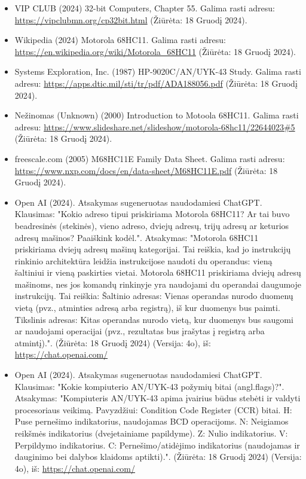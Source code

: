 \documentclass[a4paper,12pt]{article}
\begin{document}
\begin{itemize}
    \item VIP CLUB (2024) 32-bit Computers, Chapter 55. Galima rasti adresu: \url{https://vipclubmn.org/cp32bit.html} (Žiūrėta: 18 Gruodį 2024).
    \item Wikipedia (2024) Motorola 68HC11. Galima rasti adresu: \url{https://en.wikipedia.org/wiki/Motorola_68HC11} (Žiūrėta: 18 Gruodį 2024).
    \item Systems Exploration, Inc. (1987) HP-9020C/AN/UYK-43 Study. Galima rasti adresu: \url{https://apps.dtic.mil/sti/tr/pdf/ADA188056.pdf} (Žiūrėta: 18 Gruodį 2024).
    \item Nežinomas (Unknown) (2000) Introduction to Motoola 68HC11. Galima rasti adresu: \url{https://www.slideshare.net/slideshow/motorola-68hc11/22644023#5} (Žiūrėta: 18 Gruodį 2024).
    \item freescale.com (2005) M68HC11E Family Data Sheet. Galima rasti adresu: \url{https://www.nxp.com/docs/en/data-sheet/M68HC11E.pdf} (Žiūrėta: 18 Gruodį 2024).
    \item Open AI (2024). Atsakymas sugeneruotas naudodamiesi ChatGPT. Klausimas: "Kokio adreso tipui priskiriama Motorola 68HC11? Ar tai buvo beadresinės (stekinės), vieno adreso, dviejų adresų,  trijų adresų ar keturios adresų mašinos? Paaiškink kodėl.". Atsakymas: "Motorola 68HC11 priskiriama dviejų adresų mašinų kategorijai. Tai reiškia, kad jo instrukcijų rinkinio architektūra leidžia instrukcijose naudoti du operandus: vieną šaltiniui ir vieną paskirties vietai. Motorola 68HC11 priskiriama dviejų adresų mašinoms, nes jos komandų rinkinyje yra naudojami du operandai daugumoje instrukcijų. Tai reiškia: Šaltinio adresas: Vienas operandas nurodo duomenų vietą (pvz., atminties adresą arba registrą), iš kur duomenys bus paimti. Tikslinis adresas: Kitas operandas nurodo vietą, kur duomenys bus saugomi ar naudojami operacijai (pvz., rezultatas bus įrašytas į registrą arba atmintį).". (Žiūrėta: 18 Gruodį 2024) (Versija: 4o), iš: \url{https://chat.openai.com/}
    \item Open AI (2024). Atsakymas sugeneruotas naudodamiesi ChatGPT. Klausimas: "Kokie kompiuterio AN/UYK-43 požymių bitai (angl.flags)?". Atsakymas: "Kompiuteris AN/UYK-43 apima įvairius būdus stebėti ir valdyti procesoriaus veikimą. Pavyzdžiui: Condition Code Register (CCR) bitai. H: Puse pernešimo indikatorius, naudojamas BCD operacijoms. N: Neigiamos reikšmės indikatorius (dvejetainiame papildyme). Z: Nulio indikatorius. V: Perpildymo indikatorius. C: Pernešimo/atidėjimo indikatorius (naudojamas ir dauginimo bei dalybos klaidoms aptikti).". (Žiūrėta: 18 Gruodį 2024) (Versija: 4o), iš: \url{https://chat.openai.com/}

\end{itemize}
\end{document}
